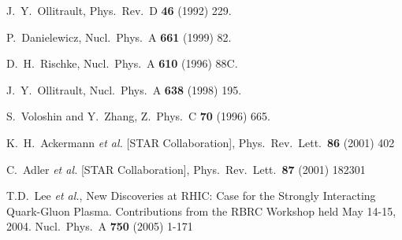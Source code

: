 \documentclass[a4paper]{book}
\numberwithin{equation}{subsection}
\begin{document}
		
	\begin{thebibliography}{99}
	
				
				  
		J.~Y.~Ollitrault,
		Phys.\ Rev.\ D {\bf 46} (1992) 229.
				
		P.~Danielewicz,
		Nucl.\ Phys.\ A {\bf 661} (1999) 82.
				
		D.~H.~Rischke,
		Nucl.\ Phys.\ A {\bf 610} (1996) 88C.
				
		J.~Y.~Ollitrault,
		Nucl.\ Phys.\ A {\bf 638} (1998) 195.
				
		S.~Voloshin and Y.~Zhang,
		Z.\ Phys.\ C {\bf 70} (1996) 665.
				
		K.~H.~Ackermann {\it et al.}  [STAR Collaboration],
		Phys.\ Rev.\ Lett.\  {\bf 86} (2001) 402
				  
		C.~Adler {\it et al.}  [STAR Collaboration],
		Phys.\ Rev.\ Lett.\  {\bf 87} (2001) 182301  
				
		T.D.~Lee {\it et al.}, 
		New Discoveries at RHIC: Case for the Strongly Interacting 
		Quark-Gluon Plasma. 
		Contributions from the RBRC Workshop held May 14-15, 2004.
		Nucl.\ Phys.\ A {\bf 750} (2005) 1-171
				
				    
	\end{thebibliography}
\end{document}
